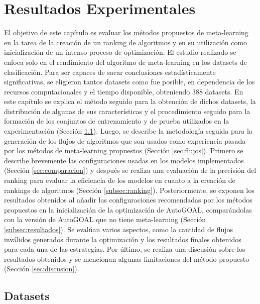 \chapter{Resultados Experimentales}\label{chapter:results}

El objetivo de este capítulo es evaluar los métodos propuestos de meta-learning en la tarea de la creación de un ranking de algoritmos y en su utilización como inicialización de un intenso proceso de optimización. El estudio realizado se enfoca solo en el rendimiento del algoritmo de meta-learning en los datasets de clasificación. Para ser capaces de sacar conclusiones estadísticamente significativas, se eligieron tantos datasets como fue posible, en dependencia de los recursos computacionales y el tiempo disponible, obteniendo 388 datasets. En este capítulo se explica el método seguido para la obtención de dichos datasets, la distribución de algunas de sus características y el procedimiento seguido para la formación de los conjuntos de entrenamiento y de prueba utilizados en la experimentación (Sección \ref{sec:datasets}). Luego, se describe la metodología seguida para la generación de los flujos de algoritmos que son usados como experiencia pasada por los métodos de meta-learning propuestos (Sección \ref{sec:flujos}). Primero se describe brevemente las configuraciones usadas en los modelos implementados (Sección \ref{sec:comparacion}) y después se realiza una evaluación de la precisión del ranking para evaluar la eficiencia de los modelos en cuanto a la creación de rankings de algoritmos (Sección \ref{subsec:ranking}). Posteriormente, se exponen los resultados obtenidos al añadir las configuraciones recomendadas por los métodos propuestos en la inicialización de la optimización de AutoGOAL, comparándolas con la versión de AutoGOAL que no tiene meta-learning (Sección \ref{subsec:resultados}). Se evalúan varios aspectos, como la cantidad de flujos inválidos generados durante la optimización y los resultados finales obtenidos para cada una de las estrategias. Por último, se realiza una discusión sobre los resultados obtenidos y se mencionan algunas limitaciones del método propuesto (Sección \ref{sec:discusion}).


\section{Datasets}\label{sec:datasets}

%
%
%

